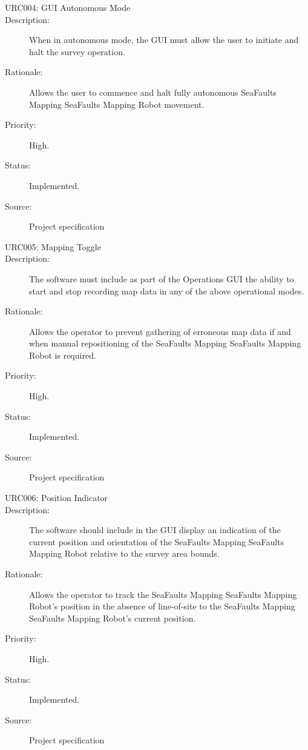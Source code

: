 \documentclass[12pt]{article}
\begin{document}
\begin{description}
\item [{URC004: GUI Autonomous Mode}\label{URC004}] 
\item [{Description: }\label{Description}] When in autonomous mode, the GUI must allow the user to initiate and halt the survey operation. 
\item[{Rationale: }\label{Rationale}] Allows the user to commence and halt fully autonomous SeaFaults Mapping SeaFaults Mapping Robot movement.
\item[{Priority: }\label{Priority}] High.
\item[{Status: }\label{Status}] Implemented.
\item[{Source: }\label{Source}] Project specification \cite{spec}

\item [{URC005: Mapping Toggle}\label{URC005}] 
\item [{Description: }\label{Description}] The software must include as part of the Operations GUI the ability to start and stop recording map data in any of the above operational modes. 
\item[{Rationale: }\label{Rationale}] Allows the operator to prevent gathering of erroneous map data if and when manual repositioning of the SeaFaults Mapping SeaFaults Mapping Robot is required.
\item[{Priority: }\label{Priority}] High.
\item[{Status: }\label{Status}] Implemented.
\item[{Source: }\label{Source}] Project specification \cite{spec}

\item [{URC006: Position Indicator}\label{URC006}] 
\item [{Description: }\label{Description}] The software should include in the GUI display an indication of the current position and orientation of the SeaFaults Mapping SeaFaults Mapping Robot relative to the survey area bounds. 
\item[{Rationale: }\label{Rationale}] Allows the operator to track the SeaFaults Mapping SeaFaults Mapping Robot's position in the absence of line-of-site to the SeaFaults Mapping SeaFaults Mapping Robot's current position.
\item[{Priority: }\label{Priority}] High.
\item[{Status: }\label{Status}] Implemented.
\item[{Source: }\label{Source}] Project specification \cite{spec}


\end{description}
\end{document}

